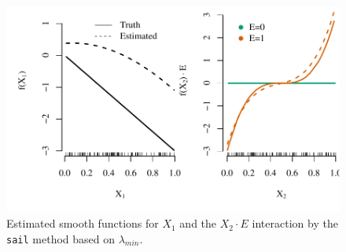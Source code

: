 \begin{knitrout}\scriptsize
	\color{fgcolor}\begin{figure}[H]
		
		{\centering \includegraphics[width=1\linewidth]{figure/toy-effects-1} 
			
		}
		
		\caption[Estimated smooth functions for $X_1$ and the $X_2 \cdot E$ interaction by the \texttt{sail} method based on $\lambda_{min}$]{Estimated smooth functions for $X_1$ and the $X_2 \cdot E$ interaction by the \texttt{sail} method based on $\lambda_{min}$.}\label{fig:toy-effects}
	\end{figure}
	
	
\end{knitrout}



